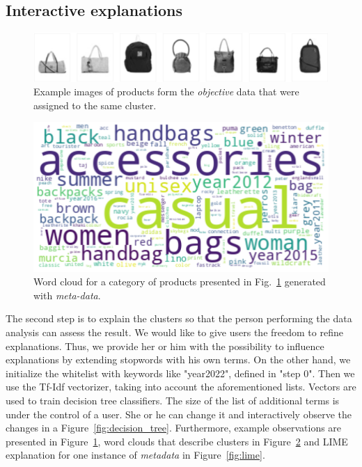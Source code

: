 \documentclass[
 twocolumn,
 hf,
]{ceurart}
\begin{document}
\subsection{Interactive explanations}\label{subsec:interactive-explanations}
\begin{figure}[h!]
  \centering
  \includegraphics[width=\linewidth]{example1-clustering-products-fashion-tex/output_62_22}
  \caption{Example images of products form the \textit{objective} data that were assigned to the same cluster.}
  \label{fig:example_products}
\end{figure}

\begin{figure}[h!]
  \centering
  \includegraphics[width=\linewidth]{example1-clustering-products-fashion-tex/output_62_23}
  \caption{Word cloud for a category of products presented in Fig.~\ref{fig:example_products} generated with \textit{meta-data}.}
  \label{fig:wordcloud}
\end{figure}

The second step is to explain the clusters so that the person performing the data analysis can assess the result.
We would like to give users the freedom to refine explanations.
Thus, we provide her or him with the possibility to influence explanations by extending stopwords with his own terms.
On the other hand, we initialize the whitelist with keywords like "year2022", defined in "step 0".
Then we use the Tf-Idf vectorizer, taking into account the aforementioned lists.
Vectors are used to train decision tree classifiers.
The size of the list of additional terms is under the control of a user.
She or he can change it and interactively observe the changes in a Figure~\ref{fig:decision_tree}.
Furthermore, example observations are presented in Figure~\ref{fig:example_products}, word clouds that describe clusters in Figure~\ref{fig:wordcloud} and LIME~\cite{lime} explanation for one instance of \textit{metadata} in Figure~\ref{fig:lime}.
\end{document}
